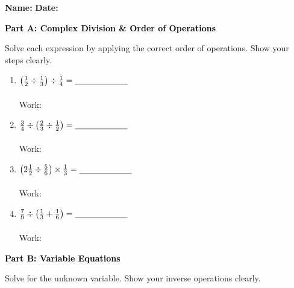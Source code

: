 \documentclass[12pt, letterpaper, fleqn]{article}
\newcommand{\blank}{\underline{\hspace{2.2cm}}}
\begin{document}
\textbf{Name:} \underline{\hspace{5cm}}
\hfill
\textbf{Date:} \underline{\hspace{3cm}}\\

\begin{tcolorbox}[colback=black!10]
    \large\textcolor{black}{\textbf{Part A: Complex Division \& Order of Operations}}
\end{tcolorbox}

\vspace{3mm}
\noindent
Solve each expression by applying the correct order of operations. Show your steps clearly.

\vspace{5mm}
\begin{enumerate}[itemsep=2.5cm, leftmargin=0.6cm]
\item $\left(\frac{1}{2} \div \frac{1}{3}\right) \div \frac{1}{4} = \blank$ \\ \\
Work: 

\item $\frac{3}{4} \div \left(\frac{2}{3} \div \frac{1}{2}\right) = \blank$ \\ \\
Work: 

\item $\left(2\frac{1}{2} \div \frac{5}{6}\right) \times \frac{1}{3} = \blank$ \\ \\
Work: 

\item $\frac{7}{9} \div \left(\frac{1}{3} + \frac{1}{6}\right) = \blank$ \\ \\
Work: 

\end{enumerate}
\newpage

\begin{tcolorbox}[colback=black!10]
    \large\textcolor{black}{\textbf{Part B: Variable Equations}}
\end{tcolorbox}

\vspace{3mm}
\noindent
Solve for the unknown variable. Show your inverse operations clearly.
\end{document}
